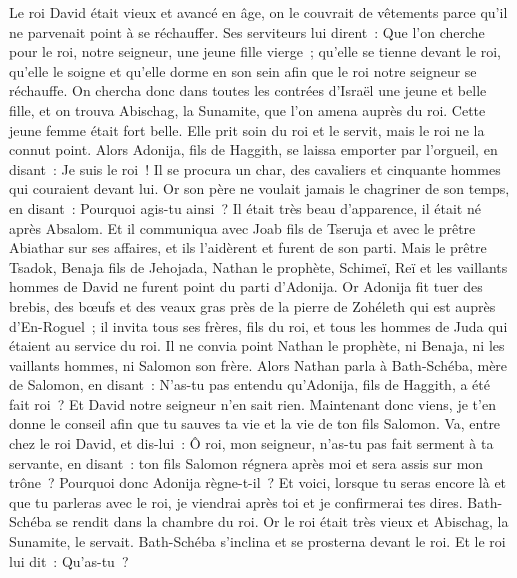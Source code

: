 \begin{multicols}{2}
\VerseOne{}Le roi David était vieux et avancé en âge, on le couvrait de vêtements parce qu'il ne parvenait point à se réchauffer.
Ses serviteurs lui dirent~: Que l'on cherche pour le roi, notre seigneur, une jeune fille vierge~; qu'elle se tienne devant le roi, qu'elle le soigne et qu'elle dorme en son sein afin que le roi notre seigneur se réchauffe.
On chercha donc dans toutes les contrées d'Israël une jeune et belle fille, et on trouva Abischag, la Sunamite, que l'on amena auprès du roi.
Cette jeune femme était fort belle. Elle prit soin du roi et le servit, mais le roi ne la connut point.
Alors Adonija, fils de Haggith, se laissa emporter par l'orgueil, en disant~: Je suis le roi~! Il se procura un char, des cavaliers et cinquante hommes qui couraient devant lui.
Or son père ne voulait jamais le chagriner de son temps, en disant~: Pourquoi agis-tu ainsi~? Il était très beau d'apparence, il était né après Absalom.
Et il communiqua avec Joab fils de Tseruja et avec le prêtre Abiathar sur ses affaires, et ils l'aidèrent et furent de son parti.
Mais le prêtre Tsadok, Benaja fils de Jehojada, Nathan le prophète, Schimeï, Reï et les vaillants hommes de David ne furent point du parti d'Adonija.
Or Adonija fit tuer des brebis, des bœufs et des veaux gras près de la pierre de Zohéleth qui est auprès d'En-Roguel~; il invita tous ses frères, fils du roi, et tous les hommes de Juda qui étaient au service du roi.
Il ne convia point Nathan le prophète, ni Benaja, ni les vaillants hommes, ni Salomon son frère.
Alors Nathan parla à Bath-Schéba, mère de Salomon, en disant~: N'as-tu pas entendu qu'Adonija, fils de Haggith, a été fait roi~? Et David notre seigneur n'en sait rien.
Maintenant donc viens, je t'en donne le conseil afin que tu sauves ta vie et la vie de ton fils Salomon.
Va, entre chez le roi David, et dis-lui~: Ô roi, mon seigneur, n'as-tu pas fait serment à ta servante, en disant~: ton fils Salomon régnera après moi et sera assis sur mon trône~? Pourquoi donc Adonija règne-t-il~?
Et voici, lorsque tu seras encore là et que tu parleras avec le roi, je viendrai après toi et je confirmerai tes dires.
Bath-Schéba se rendit dans la chambre du roi. Or le roi était très vieux et Abischag, la Sunamite, le servait.
Bath-Schéba s'inclina et se prosterna devant le roi. Et le roi lui dit~: Qu'as-tu~?

\end{multicols}
